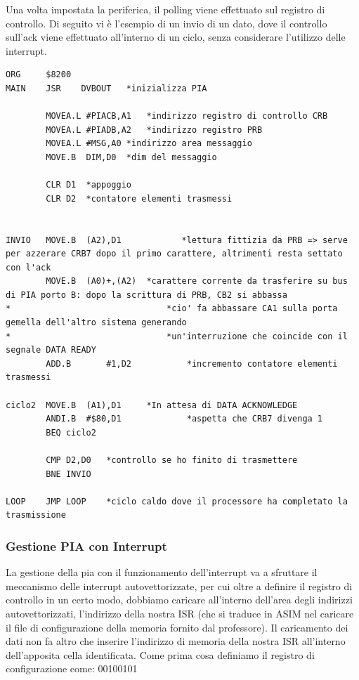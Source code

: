 Una volta impostata la periferica, il polling viene effettuato sul registro di controllo. Di seguito vi è l'esempio di un invio di un dato, dove il controllo sull'ack viene effettuato all'interno di un ciclo, senza considerare l'utilizzo delle interrupt.

\begin{lstlisting}
ORG     $8200
MAIN    JSR    DVBOUT	*inizializza PIA 

        MOVEA.L	#PIACB,A1	*indirizzo registro di controllo CRB
        MOVEA.L	#PIADB,A2	*indirizzo registro PRB
        MOVEA.L	#MSG,A0	*indirizzo area messaggio
        MOVE.B	DIM,D0	*dim del messaggio

        CLR	D1	*appoggio
        CLR	D2	*contatore elementi trasmessi


INVIO	MOVE.B	(A2),D1            *lettura fittizia da PRB => serve per azzerare CRB7 dopo il primo carattere, altrimenti resta settato con l'ack
        MOVE.B	(A0)+,(A2)	*carattere corrente da trasferire su bus di PIA porto B: dopo la scrittura di PRB, CB2 si abbassa
*								*cio' fa abbassare CA1 sulla porta gemella dell'altro sistema generando 
*								*un'interruzione che coincide con il segnale DATA READY
        ADD.B		#1,D2		    *incremento contatore elementi trasmessi

ciclo2	MOVE.B	(A1),D1		*In attesa di DATA ACKNOWLEDGE
        ANDI.B	#$80,D1				*aspetta che CRB7 divenga 1
        BEQ	ciclo2

        CMP	D2,D0	*controllo se ho finito di trasmettere
        BNE	INVIO

LOOP  	JMP LOOP	*ciclo caldo dove il processore ha completato la trasmissione	
\end{lstlisting}


\subsubsection{Gestione PIA con Interrupt}\label{par:PIA-POL}
La gestione della pia con il funzionamento dell'interrupt va a sfruttare il meccanismo delle interrupt autovettorizzate, per cui oltre a definire il registro di controllo in un certo modo, dobbiamo caricare all'interno dell'area degli indirizzi autovettorizzati, l'indirizzo della nostra ISR (che si traduce in ASIM nel caricare il file di configurazione della memoria fornito dal professore). Il caricamento dei dati non fa altro che inserire l'indirizzo di memoria della nostra ISR all'interno dell'apposita cella identificata.
Come prima cosa definiamo il registro di configurazione come: 00100101

